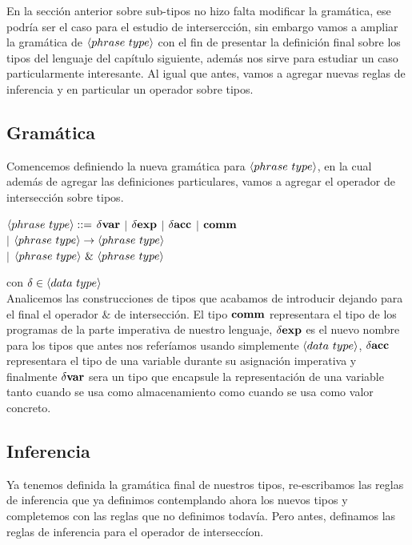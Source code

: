 En la secci\'on anterior sobre sub-tipos no hizo falta modificar la gram\'atica, ese
podr\'ia ser el caso para el estudio de intersercci\'on, sin embargo vamos a ampliar 
la gram\'atica de $\langle phrase \ type \rangle$ con el fin de presentar la definici\'on
final sobre los tipos del lenguaje del cap\'itulo siguiente, adem\'as nos sirve para
estudiar un caso particularmente interesante. Al igual que antes, vamos a agregar 
nuevas reglas de inferencia y en particular un operador sobre tipos.

\subsection{Gram\'atica}

Comencemos definiendo la nueva gram\'atica para $\langle phrase \ type \rangle$, en la cual
adem\'as de agregar las definiciones particulares, vamos a agregar el operador de 
intersecci\'on sobre tipos.

\begin{center} 
$\langle phrase \ type \rangle::=$ $\delta \textbf{var}$ $|$ $\delta \textbf{exp}$ $|$ $\delta \textbf{acc}$ $|$ $\textbf{comm}$\\
$|$ $\langle phrase \ type \rangle \rightarrow \langle phrase \ type \rangle$ \\
$|$ $\lrangles{phrase \ type} \ \& \ \lrangles{phrase \ type}$
\end{center}
con $\delta \in \lrangles{data \ type}$\\

Analicemos las construcciones de tipos que acabamos de introducir dejando para el final
el operador $\&$ de intersecci\'on. El tipo $\textbf{comm}$ representara el tipo de los programas
de la parte imperativa de nuestro lenguaje, $\delta \textbf{exp}$ es el nuevo nombre para los tipos
que antes nos refer\'iamos usando simplemente $\langle data \ type \rangle$, $\delta \textbf{acc}$ 
representara el tipo de una variable durante su asignaci\'on imperativa y finalmente
$\delta \textbf{var}$ sera un tipo que encapsule la representaci\'on de una variable tanto
cuando se usa como almacenamiento como cuando se usa como valor concreto.

\subsection{Inferencia}

Ya tenemos definida la gram\'atica final de nuestros tipos, re-escribamos las reglas de
inferencia que ya definimos contemplando ahora los nuevos tipos y completemos con las
reglas que no definimos todav\'ia. Pero antes, definamos las reglas de inferencia para
el operador de intersecc\'ion.

